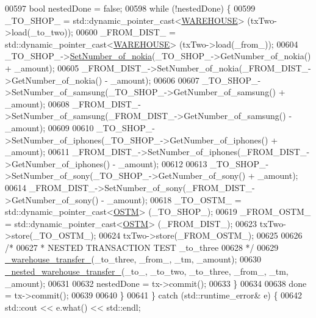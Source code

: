 \begin{DoxyCode}
00597             \textcolor{keywordtype}{bool} nestedDone = \textcolor{keyword}{false};
00598             \textcolor{keywordflow}{while} (!nestedDone) \{
00599                 \_TO\_SHOP\_ = std::dynamic\_pointer\_cast<\hyperlink{class_w_a_r_e_h_o_u_s_e}{WAREHOUSE}> (txTwo->load(\_to\_two));
00600                 \_FROM\_DIST\_ = std::dynamic\_pointer\_cast<\hyperlink{class_w_a_r_e_h_o_u_s_e}{WAREHOUSE}> (txTwo->load(\_from\_));
00604                 \_TO\_SHOP\_->\hyperlink{class_w_a_r_e_h_o_u_s_e_a300d1fe21a47e45c0d5d27e25add346f_a300d1fe21a47e45c0d5d27e25add346f}{SetNumber\_of\_nokia}(\_TO\_SHOP\_->GetNumber\_of\_nokia() + \_amount);
00605                 \_FROM\_DIST\_->SetNumber\_of\_nokia(\_FROM\_DIST\_->GetNumber\_of\_nokia() - \_amount);
00606 
00607                 \_TO\_SHOP\_->SetNumber\_of\_samsung(\_TO\_SHOP\_->GetNumber\_of\_samsung() + \_amount);
00608                 \_FROM\_DIST\_->SetNumber\_of\_samsung(\_FROM\_DIST\_->GetNumber\_of\_samsung() - \_amount);
00609 
00610                 \_TO\_SHOP\_->SetNumber\_of\_iphones(\_TO\_SHOP\_->GetNumber\_of\_iphones() + \_amount);
00611                 \_FROM\_DIST\_->SetNumber\_of\_iphones(\_FROM\_DIST\_->GetNumber\_of\_iphones() - \_amount);
00612 
00613                 \_TO\_SHOP\_->SetNumber\_of\_sony(\_TO\_SHOP\_->GetNumber\_of\_sony() + \_amount);
00614                 \_FROM\_DIST\_->SetNumber\_of\_sony(\_FROM\_DIST\_->GetNumber\_of\_sony() - \_amount);
00618                 \_TO\_OSTM\_ = std::dynamic\_pointer\_cast<\hyperlink{class_o_s_t_m}{OSTM}> (\_TO\_SHOP\_);
00619                 \_FROM\_OSTM\_ = std::dynamic\_pointer\_cast<\hyperlink{class_o_s_t_m}{OSTM}> (\_FROM\_DIST\_);
00623                 txTwo->store(\_TO\_OSTM\_);
00624                 txTwo->store(\_FROM\_OSTM\_);
00625 
00626                 \textcolor{comment}{/*}
00627 \textcolor{comment}{                 * NESTED TRANSACTION TEST \_to\_three}
00628 \textcolor{comment}{                 */}
00629                 \hyperlink{main_8cpp_a1c170f18aac9dbb8aba1ad2f7e4619cc_a1c170f18aac9dbb8aba1ad2f7e4619cc}{\_warehouse\_transfer\_}(\_to\_three, \_from\_, \_tm, \_amount);
00630                 \hyperlink{main_8cpp_a52fcb0d50c67be8cd20f2aca338683c7_a52fcb0d50c67be8cd20f2aca338683c7}{\_nested\_warehouse\_transfer\_}(\_to\_, \_to\_two, \_to\_three, \_from\_, 
      \_tm, \_amount);
00631 
00632                 nestedDone = tx->commit();
00633             \}
00634 
00638             done = tx->commit();
00639 
00640         \}
00641     \} \textcolor{keywordflow}{catch} (std::runtime\_error& e) \{
00642         std::cout << e.what() << std::endl;

\end{DoxyCode}
